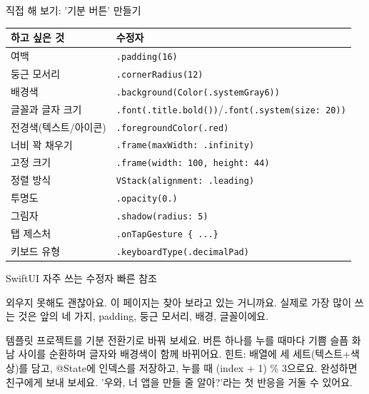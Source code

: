 \begin{tcbpractice}{직접 해 보기: '기분 버튼' 만들기}

\begin{center}
\begin{tabularx}{\linewidth}{|X|X|}
\hline
\textbf{하고 싶은 것} & \textbf{수정자} \tabularnewline
\hline
여백 & \texttt{.\allowbreak padding(16)} \tabularnewline
둥근 모서리 & \texttt{.\allowbreak cornerRadius(12)} \tabularnewline
배경색 & \texttt{.\allowbreak background(Color(.\allowbreak systemGray6))} \tabularnewline
글꼴과 글자 크기 & \texttt{.\allowbreak font(.\allowbreak title.\allowbreak bold())}/\texttt{.\allowbreak font(.\allowbreak system(size: 20))} \tabularnewline
전경색(텍스트/아이콘) & \texttt{.\allowbreak foregroundColor(.\allowbreak red)} \tabularnewline
너비 꽉 채우기 & \texttt{.\allowbreak frame(maxWidth: .\allowbreak infinity)} \tabularnewline
고정 크기 & \texttt{.\allowbreak frame(width: 100, height: 44)} \tabularnewline
정렬 방식 & \texttt{VStack(alignment: .\allowbreak leading)} \tabularnewline
투명도 & \texttt{.\allowbreak opacity(0.\allowbreak 6)} \tabularnewline
그림자 & \texttt{.\allowbreak shadow(radius: 5)} \tabularnewline
탭 제스처 & \texttt{.\allowbreak onTapGesture \{ .\allowbreak .\allowbreak .\allowbreak  \}} \tabularnewline
키보드 유형 & \texttt{.\allowbreak keyboardType(.\allowbreak decimalPad)} \tabularnewline
\hline
\end{tabularx}
\end{center}

\begin{center}\small\color{gray}SwiftUI 자주 쓰는 수정자 빠른 참조\end{center}

외우지 못해도 괜찮아요. 이 페이지는 찾아 보라고 있는 거니까요. 실제로 가장 많이 쓰는 것은 앞의 네 가지, padding, 둥근 모서리, 배경, 글꼴이에요.

템플릿 프로젝트를 기분 전환기로 바꿔 보세요. 버튼 하나를 누를 때마다 기쁨 슬픔 화남 사이를 순환하며 글자와 배경색이 함께 바뀌어요. 힌트: 배열에 세 세트(텍스트+색상)를 담고, @State에 인덱스를 저장하고, 누를 때 (index + 1) \% 3으로요. 완성하면 친구에게 보내 보세요. '우와, 너 앱을 만들 줄 알아?'라는 첫 반응을 거둘 수 있어요.

\end{tcbpractice}


